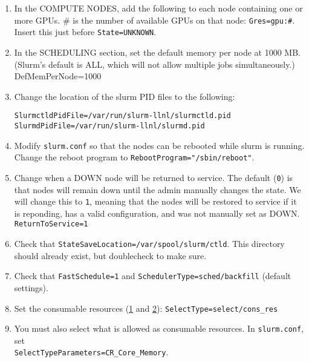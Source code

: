\begin{enumerate}
\begin{enumerate}
\begin{enumerate}
          \item In the COMPUTE NODES, add the following to each node containing one or more GPUs. \# is the number of available GPUs on that node: \texttt{Gres=gpu:\#}. Insert this just before \texttt{State=UNKNOWN}.

          \item In the SCHEDULING section, set the default memory per node at 1000 MB. (Slurm's default is ALL, which will not allow multiple jobs simultaneously.) \\
            DefMemPerNode=1000

          \item Change the location of the slurm PID files to the following:

            \texttt{SlurmctldPidFile=/var/run/slurm-llnl/slurmctld.pid} \\ %
            \texttt{SlurmdPidFile=/var/run/slurm-llnl/slurmd.pid} %

          \item Modify \texttt{slurm.conf} so that the nodes can be rebooted while slurm is running. Change the reboot program to \texttt{RebootProgram="/sbin/reboot"}. 

          \item Change when a DOWN node will be returned to service. The default (\texttt{0}) is that nodes will remain down until the admin manually changes the state. We will change this to \texttt{1}, meaning that the nodes will be restored to service if it is reponding, has a valid configuration, and was not manually set as DOWN. \\
            \texttt{ReturnToService=1}

          \item Check that \texttt{StateSaveLocation=/var/spool/slurm/ctld}. This directory should already exist, but doublecheck to make sure.

          \item Check that \texttt{FastSchedule=1} and \texttt{SchedulerType=sched/backfill} (default settings).
	
          \item Set the consumable resources (\href{https://slurm.schedmd.com/cons_res.html}{1} and \href{https://slurm.schedmd.com/cons_res_share.html}{2}):
            \texttt{SelectType=select/cons\_res}
	
          \item You must also select what is allowed as consumable resources. In \texttt{slurm.conf}, set \\
            \texttt{SelectTypeParameters=CR\_Core\_Memory}. 
	

\end{enumerate}
\end{enumerate}
\end{enumerate}
